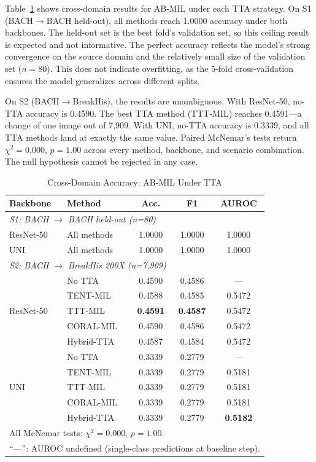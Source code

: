 \documentclass[conference]{IEEEtran}
\begin{document}
Table~\ref{tab:cross_domain} shows cross-domain results for AB-MIL under each TTA strategy. On S1 (BACH$\rightarrow$BACH held-out), all methods reach 1.0000 accuracy under both backbones. The held-out set is the best fold's validation set, so this ceiling result is expected and not informative. The perfect accuracy reflects the model's strong convergence on the source domain and the relatively small size of the validation set ($n=80$). This does not indicate overfitting, as the 5-fold cross-validation ensures the model generalizes across different splits.

On S2 (BACH$\rightarrow$BreakHis), the results are unambiguous. With ResNet-50, no-TTA accuracy is 0.4590. The best TTA method (TTT-MIL) reaches 0.4591---a change of one image out of 7,909. With UNI, no-TTA accuracy is 0.3339, and all TTA methods land at exactly the same value. Paired McNemar's tests return $\chi^2 = 0.000$, $p = 1.00$ across every method, backbone, and scenario combination. The null hypothesis cannot be rejected in any case.

\begin{table}[!hbt]
\caption{Cross-Domain Accuracy: AB-MIL Under TTA}
\label{tab:cross_domain}
\centering
\begin{tabular}{llccc}
\toprule
\textbf{Backbone} & \textbf{Method} & \textbf{Acc.} & \textbf{F1} & \textbf{AUROC} \\
\midrule
\multicolumn{5}{l}{\textit{S1: BACH $\rightarrow$ BACH held-out (n=80)}} \\
ResNet-50 & All methods & 1.0000 & 1.0000 & 1.0000 \\
UNI & All methods & 1.0000 & 1.0000 & 1.0000 \\
\midrule
\multicolumn{5}{l}{\textit{S2: BACH $\rightarrow$ BreakHis 200X (n=7,909)}} \\
\multirow{5}{*}{ResNet-50}
 & No TTA        & 0.4590 & 0.4586 & --- \\
 & TENT-MIL      & 0.4588 & 0.4585 & 0.5472 \\
 & TTT-MIL       & \textbf{0.4591} & \textbf{0.4587} & 0.5472 \\
 & CORAL-MIL     & 0.4590 & 0.4586 & 0.5472 \\
 & Hybrid-TTA    & 0.4587 & 0.4584 & 0.5472 \\
\midrule
\multirow{5}{*}{UNI}
 & No TTA        & 0.3339 & 0.2779 & --- \\
 & TENT-MIL      & 0.3339 & 0.2779 & 0.5181 \\
 & TTT-MIL       & 0.3339 & 0.2779 & 0.5181 \\
 & CORAL-MIL     & 0.3339 & 0.2779 & 0.5181 \\
 & Hybrid-TTA    & 0.3339 & 0.2779 & \textbf{0.5182} \\
\bottomrule
\multicolumn{5}{l}{All McNemar tests: $\chi^2 = 0.000$, $p = 1.00$.} \\
\multicolumn{5}{l}{``---'': AUROC undefined (single-class predictions at baseline step).} \\
\end{tabular}
\end{table}
\end{document}
